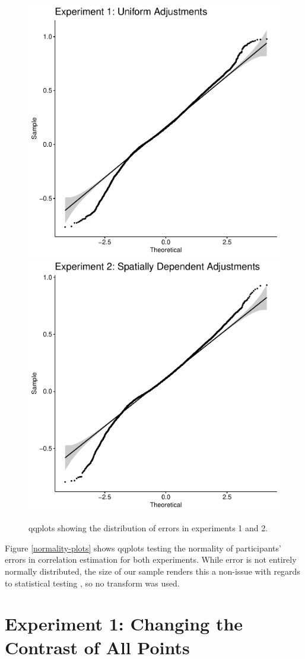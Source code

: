 \documentclass[preprint, 3p,
authoryear]{elsarticle} %
\begin{document}
\begin{figure}

\includegraphics[width=0.5\linewidth]{contrast_and_scatterplots_files/figure-latex/normality-plots-1} \includegraphics[width=0.5\linewidth]{contrast_and_scatterplots_files/figure-latex/normality-plots-2} \hfill{}

\caption{\label{normality-plots}qqplots showing the distribution of errors in experiments 1 and 2.}\label{fig:normality-plots}
\end{figure}

Figure \ref{normality-plots} shows qqplots testing the normality of
participants' errors in correlation estimation for both experiments.
While error is not entirely normally distributed, the size of our sample
renders this a non-issue with regards to statistical testing
\citep{ghasemi_2012}, so no transform was used.

\hypertarget{experiment-1-changing-the-contrast-of-all-points}{%
\section{Experiment 1: Changing the Contrast of All
Points}\label{experiment-1-changing-the-contrast-of-all-points}}
\end{document}
